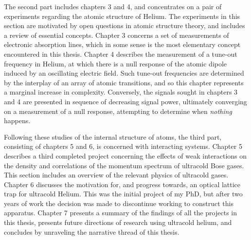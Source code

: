 The second part includes chapters 3 and 4, and concentrates on a pair of
experiments regarding the atomic structure of Helium.
	The experiments in
this section are motivated by open questions in atomic structure theory,
and includes a review of essential concepts.
	Chapter 3 concerns a set of
measurements of electronic absorption lines, which in some sense is the
most elementary concept encountered in this thesis.
	Chapter 4 describes
the measurement of a tune-out frequency in Helium, at which there is a
null response of the atomic dipole induced by an oscillating electric
field.
	Such tune-out frequencies are determined by the interplay of an
array of atomic transitions, and so this chapter represents a marginal
increase in complexity.
	Conversely, the signals sought in chapters 3 and
4 are presented in sequence of decreasing signal power, ultimately
converging on a measurement of a null response, attempting to determine
when \emph{nothing} happens.

Following these studies of the internal structure of atoms, the third
part, consisting of chapters 5 and 6, is concerned with interacting
systems.
	Chapter 5 describes a third completed project concerning the
effects of weak interactions on the density and correlations of the
momentum spectrum of ultracold Bose gases.
	This section includes an
overview of the relevant physics of ultracold gases.
	Chapter 6 discusses
the motivation for, and progress towards, an optical lattice trap for
ultracold Helium.
	This was the initial project of my PhD, but after two
years of work the decision was made to discontinue working to construct
this apparatus.
	Chapter 7 presents a summary of the findings of all the
projects in this thesis, presents future directions of research using
ultracold helium, and concludes by unraveling the narrative thread of
this thesis.





